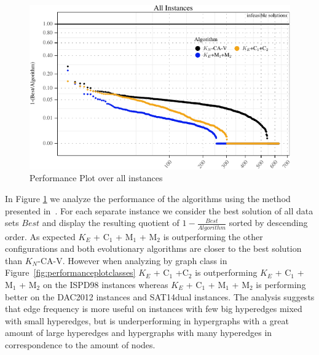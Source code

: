 \documentclass[a4paper,12pt,titlepage, BCOR7mm,headsepline]{scrbook}
\numberwithin{equation}{section}
\begin{document}

\begin{figure}[H]
\begin{center}
\includegraphics[width=\textwidth]{rnw/tuning_subset_plots/performance_plot_main-1}
\caption{Performance Plot over all instances}
\label{fig:performanceplot}
\end{center}
\end{figure}
In Figure \ref{fig:performanceplot} we analyze the performance of the algorithms using the method presented in~\cite{schlag2016k}. For each separate instance we consider the best solution of all data sets $Best$ and display the resulting quotient of $1 - \frac{Best}{Algorithm}$ sorted by descending order. As expected $K_E$ + C$_1$ + M$_1$ + M$_2$ is outperforming the other configurations and both evolutionary algorithms are closer to the best solution than $K_N$-CA-V. However when analyzing by graph class in Figure~\ref{fig:performanceplotclasses} $K_E$ + C$_1$ +C$_2$ is outperforming $K_E$ + C$_1$ + M$_1$ + M$_2$ on the ISPD98 instances whereas $K_E$ + C$_1$ + M$_1$ + M$_2$ is performing better on the DAC2012 instances and SAT14dual instances. The analysis suggests that edge frequency is more useful on instances with few big hyperedges mixed with small hyperedges, but is underperforming in hypergraphs with a great amount of large hyperedges and hypergraphs with many hyperedges in correspondence to the amount of nodes.
\end{document}
